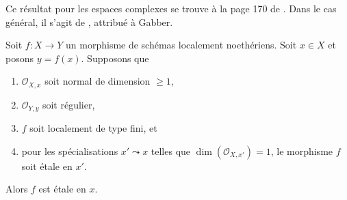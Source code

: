 \begin{lemma}
\label{lemma-purity-ramification}
\begin{reference}
Ce résultat pour les espaces complexes se trouve à la page 170 de \cite{Fischer}.
Dans le cas général, il s'agit de \cite[théorème 2.4]{Zong}, attribué à Gabber.
\end{reference}
Soit $f : X \to Y$ un morphisme de schémas localement noethériens.
Soit $x \in X$ et posons $y = f(x)$. Supposons que
\begin{enumerate}
\item $\mathcal{O}_{X, x}$ soit normal de dimension $\geq 1$,
\item $\mathcal{O}_{Y, y}$ soit régulier,
\item $f$ soit localement de type fini, et
\item pour les spécialisations $x' \leadsto x$ telles que
$\dim(\mathcal{O}_{X, x'}) = 1$, le morphisme $f$ soit \'etale en $x'$.
\end{enumerate}
Alors $f$ est \'etale en $x$.
\end{lemma}

